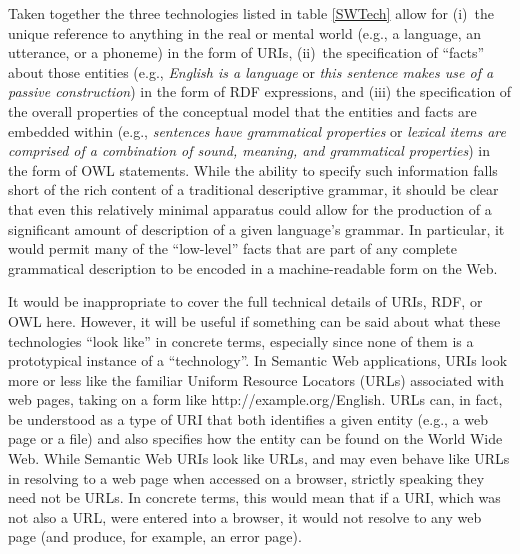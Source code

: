 \documentclass[12pt]{article}
\newcommand{\tref}[1]{table \ref{#1}}
\begin{document}
Taken together the three technologies listed in \tref{SWTech} allow for (i)~the
unique reference to anything in the real or mental world (e.g., a language, an
utterance, or a phoneme) in the form of URIs, (ii)~the specification of
``facts'' about those entities (e.g., \emph{English is a language} or \emph{this
sentence makes use of a passive construction}) in the form of RDF expressions,
and (iii) the specification of the overall properties of the conceptual model
that the entities and facts are embedded within (e.g., \emph{sentences have
grammatical properties} or \emph{lexical items are comprised of a combination of
sound, meaning, and grammatical properties}) in the form of OWL statements.
While the ability to specify such information falls short of the rich content of
a traditional descriptive grammar, it should be clear
that even this relatively minimal apparatus could allow for the production of a
significant amount of description of a given language's grammar. In particular,
it would permit many of the ``low-level'' facts that are part of any complete
grammatical description to be encoded in a machine-readable form on the Web.

It would be inappropriate to cover the full technical details of URIs, RDF, or
OWL here. However, it will be useful if something can be said about what these
technologies ``look like'' in concrete terms, especially since none of them is a
prototypical instance of a ``technology''. In Semantic Web applications, URIs
look more or less like the familiar Uniform Resource Locators (URLs) associated
with web pages, taking on a form like http://example.org/English. URLs can, in
fact, be understood as a type of URI that both identifies a given entity (e.g.,
a web page or a file) and also specifies how the entity can be found on the
World Wide Web. While Semantic Web URIs look like URLs, and may even behave like
URLs in resolving to a web page when accessed on a browser, strictly speaking
they need not be URLs. In concrete terms, this would mean that if a URI, which
was not also a URL, were entered into a browser, it would not resolve to any web
page (and produce, for example, an error page).
\end{document}
